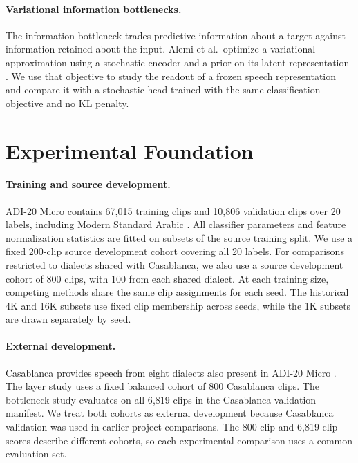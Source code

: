 \documentclass[11pt]{article}
\begin{document}
\paragraph{Variational information bottlenecks.}
The information bottleneck trades predictive information about a target against information retained about the input. Alemi et al.\ optimize a variational approximation using a stochastic encoder and a prior on its latent representation \cite{alemi}. We use that objective to study the readout of a frozen speech representation and compare it with a stochastic head trained with the same classification objective and no KL penalty.

\section{Experimental Foundation}
\paragraph{Training and source development.}
ADI-20 Micro contains 67{,}015 training clips and 10{,}806 validation clips over 20 labels, including Modern Standard Arabic \cite{adi20}. All classifier parameters and feature normalization statistics are fitted on subsets of the source training split. We use a fixed 200-clip source development cohort covering all 20 labels. For comparisons restricted to dialects shared with Casablanca, we also use a source development cohort of 800 clips, with 100 from each shared dialect. At each training size, competing methods share the same clip assignments for each seed. The historical 4K and 16K subsets use fixed clip membership across seeds, while the 1K subsets are drawn separately by seed.

\paragraph{External development.}
Casablanca provides speech from eight dialects also present in ADI-20 Micro \cite{casablanca}. The layer study uses a fixed balanced cohort of 800 Casablanca clips. The bottleneck study evaluates on all 6{,}819 clips in the Casablanca validation manifest. We treat both cohorts as external development because Casablanca validation was used in earlier project comparisons. The 800-clip and 6{,}819-clip scores describe different cohorts, so each experimental comparison uses a common evaluation set.
\end{document}
